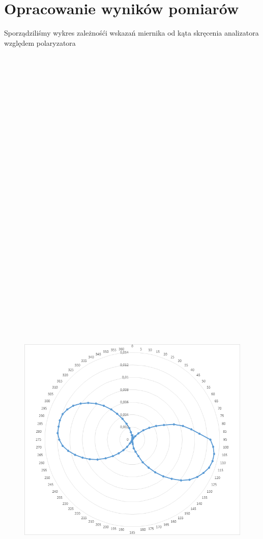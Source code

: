 \documentclass{article}
\begin{document}
\section{Opracowanie wyników pomiarów}
Sporządziliśmy wykres zależnośći wskazań miernika od kąta skręcenia analizatora względem polaryzatora\\\\\\\\\\\\\\\\\\\\\\\\\\\\\\\\\\\\\\\\\\\\\\\\\\\\\\\\\\\\
\begin{figure}
\centering
\includegraphics[width=18cm]{wykres2.png}
\end{figure}
\end{document}
